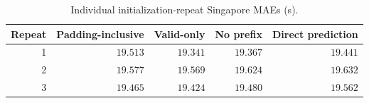\begin{table}[t]
\centering\footnotesize\setlength{\tabcolsep}{4pt}
\caption{Individual initialization-repeat Singapore MAEs (s).}\label{tab:prefix_seeds}
\begin{tabular}{rrrrr}\toprule
Repeat & Padding-inclusive & Valid-only & No prefix & Direct prediction\\\midrule
1 & $19.513$ & $19.341$ & $19.367$ & $19.441$\\
2 & $19.577$ & $19.569$ & $19.624$ & $19.632$\\
3 & $19.465$ & $19.424$ & $19.480$ & $19.562$\\
\bottomrule\end{tabular}
\end{table}
